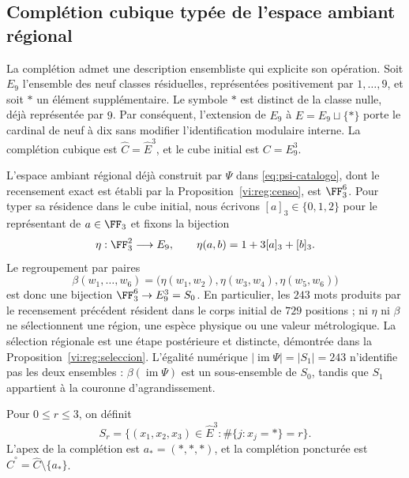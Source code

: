 \subsection{Complétion cubique typée de l’espace ambiant régional}
\label{vi:cubo:completacion}

La complétion admet une description ensembliste qui explicite son
opération. Soit \(E_9\) l'ensemble des neuf classes résiduelles, représentées
positivement par \(1,\ldots,9\), et soit \(\ast\) un élément supplémentaire.
Le symbole \(\ast\) est distinct de la classe nulle, déjà représentée par \(9\).
Par conséquent, l'extension de \(E_9\) à
\(\widehat E=E_9\sqcup\{\ast\}\) porte le cardinal de neuf à dix
sans modifier l'identification modulaire interne. La complétion cubique est
\(\widehat C=\widehat E^3\), et le cube initial est \(C=E_9^3\).

L’espace ambiant régional déjà construit par \(\Psi\) dans
\eqref{eq:psi-catalogo}, dont le recensement exact est établi par la
Proposition~\ref{vi:reg:censo}, est \(\FF_3^6\). Pour typer sa résidence
dans le cube initial, nous écrivons \([a]_3\in\{0,1,2\}\)
pour le représentant de \(a\in\FF_3\) et fixons la bijection
\[
 \eta:\FF_3^2\longrightarrow E_9,
 \qquad \eta(a,b)=1+3[a]_3+[b]_3.
\]
Le regroupement par paires
\begin{equation}
 \beta(w_1,\ldots,w_6)=
 \bigl(\eta(w_1,w_2),\eta(w_3,w_4),\eta(w_5,w_6)\bigr)
 \label{vi:cubo:beta}
\end{equation}
est donc une bijection \(\FF_3^6\to E_9^3=S_0\). En particulier,
les \(243\) mots produits par le recensement précédent résident dans le corps
initial de \(729\) positions ; ni \(\eta\) ni \(\beta\) ne sélectionnent une
région, une espèce physique ou une valeur métrologique. La sélection régionale
est une étape postérieure et distincte, démontrée dans la
Proposition~\ref{vi:reg:seleccion}. L’égalité numérique
\(|\operatorname{im}\Psi|=|S_1|=243\) n’identifie pas les deux ensembles :
\(\beta(\operatorname{im}\Psi)\) est un sous-ensemble de \(S_0\), tandis
que \(S_1\) appartient à la couronne d’agrandissement.



\begin{definition}
Pour \(0\leq r\leq3\), on définit
\[
 S_r=\{(x_1,x_2,x_3)\in\widehat E^3:
             \#\{j:x_j=\ast\}=r\}.
\]
L'apex de la complétion est \(a_\ast=(\ast,\ast,\ast)\), et la
complétion poncturée est \(\widehat C^{\circ}=\widehat C\setminus\{a_\ast\}\).
\end{definition}

